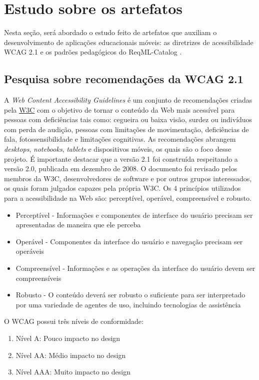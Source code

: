 \section{Estudo sobre os artefatos}
Nesta seção, será abordado o estudo feito de artefatos que auxiliam o desenvolvimento de aplicações educacionais móveis: as diretrizes de acessibilidade WCAG 2.1 e os padrões pedagógicos do ReqML-Catalog \citep{soad2017reqml}.

\subsection{Pesquisa sobre recomendações da WCAG 2.1}
A \textit{Web Content Accessibility Guidelines} \citep{wcag} é um conjunto de recomendações criadas pela \href{https://www.w3.org/}{W3C} com o objetivo de tornar o conteúdo da Web mais acessível para pessoas com deficiências tais como: cegueira ou baixa visão, surdez ou indivíduos com perda de audição, pessoas com limitações de movimentação, deficiências de fala, fotossensibilidade e limitações cognitivas. As recomendações abrangem \textit{desktops}, \textit{notebooks}, \textit{tablets} e dispositivos móveis, os quais são o foco desse projeto. É importante destacar que a versão 2.1 foi construída respeitando a versão 2.0, publicada em dezembro de 2008. O documento foi revisado pelos membros da W3C, desenvolvedores de software e por outros grupos interessados, os quais foram julgados capazes pela própria W3C. Os 4 princípios utilizados para a acessibilidade na Web são: perceptível, operável, compreensível e robusto.
\begin{itemize}
    \item Perceptível - Informações e componentes de interface do usuário precisam ser apresentadas de maneira que ele perceba
    \item Operável - Componentes da interface do usuário e navegação precisam ser operáveis
    \item Compreensível - Informações e as operações da interface do usuário devem ser compreensíveis
    \item Robusto - O conteúdo deverá ser robusto o suficiente para ser interpretado por uma variedade de agentes de uso, incluindo tecnologias de assistência
\end{itemize}

O WCAG possui três níveis de conformidade:
\begin{enumerate}
    \item Nível A: Pouco impacto no design
    \item Nível AA: Médio impacto no design
    \item Nível AAA: Muito impacto no design
\end{enumerate}

